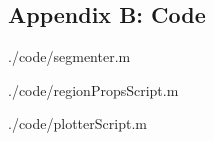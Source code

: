 \documentclass[ twocolumn,notitlepage]{ revtex4-1}
\begin{document}
\newpage
\begin{widetext}
\subsection*{Appendix B: Code}

                {./code/segmenter.m}

\newpage

            {./code/regionPropsScript.m}

\newpage          

                {./code/plotterScript.m}
\end{widetext}
\end{document}
